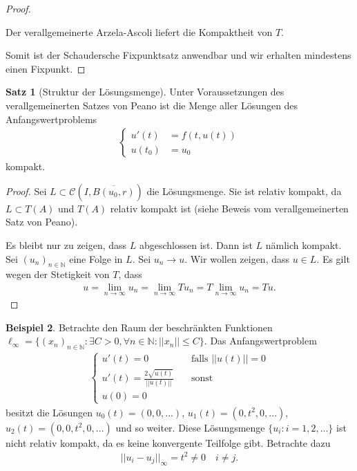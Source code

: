 \documentclass[a4paper]{article}
\theoremstyle{definition}
\newtheorem{theorem}{Satz}
\newtheorem{example}[theorem]{Beispiel}
\begin{document}
\begin{proof}
\begin{itemize}
    Der verallgemeinerte Arzela-Ascoli liefert die Kompaktheit von $T$.
\end{itemize}
Somit ist der Schaudersche Fixpunktsatz anwendbar und wir erhalten mindestens einen Fixpunkt.
\end{proof}

\begin{theorem}[Struktur der Lösungsmenge]
Unter Voraussetzungen des verallgemeinerten Satzes von Peano ist die Menge aller Lösungen des Anfangswertproblems 
\begin{align*}
    \begin{cases}
        u'(t)  &= f(t,u(t)) \\
        u(t_0) &= u_0
    \end{cases}
\end{align*}
kompakt.
\end{theorem}

\begin{proof}
    Sei $L \subset \mathcal{C}(I, \overline{B(u_0,r)})$ die Lösungsmenge. Sie ist relativ kompakt, da $L \subset T(A)$ und $T(A)$ relativ kompakt ist (siehe Beweis vom verallgemeinerten Satz von Peano). 
    
    Es bleibt nur zu zeigen, dass $L$ abgeschlossen ist. Dann ist $L$ nämlich kompakt. Sei $(u_n)_{n \in \mathbb{N}}$ eine Folge in $L$. Sei $u_n \to u$. Wir wollen zeigen, dass $u \in L$. Es gilt wegen der Stetigkeit von $T$, dass
    \begin{align*}
        u = \lim_{n \to \infty} u_n = \lim_{n \to \infty} Tu_n = T \lim_{n \to \infty} u_n= Tu. 
    \end{align*}
\end{proof}

\begin{example}
Betrachte den Raum der beschränkten Funktionen $\ell_\infty = \{ (x_n)_{n \in \mathbb{N}} : \exists C > 0, \forall n \in \mathbb{N} : ||x_n|| \leq C \}$. Das Anfangswertproblem
\begin{align*}
    \begin{cases}
        u'(t) = 0 &\quad \text{falls $||u(t)|| = 0$} \\
        u'(t) = \frac{2\sqrt{u(t)}}{||u(t)||} &\quad \text{sonst} \\
        u(0) = 0
    \end{cases}
\end{align*}
besitzt die Lösungen $u_0(t) = (0,0,...)$, $u_1(t) = (0, t^2, 0,...)$, $u_2(t) = (0,0,t^2,0,...)$ und so weiter. Diese Lösungsmenge $\{ u_i : i = 1,2,... \}$ ist nicht relativ kompakt, da es keine konvergente Teilfolge gibt. Betrachte dazu 
\begin{align*}
    ||u_i - u_j||_\infty = t^2 \neq 0 \quad i \neq j.
\end{align*}
\end{example}
\end{document}
